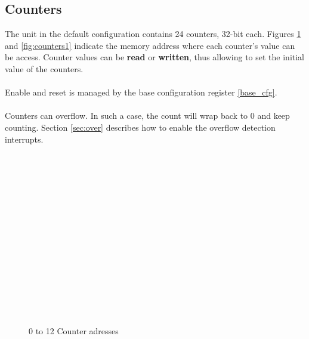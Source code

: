 \subsection{Counters}\label{sec:count}
The unit in the default configuration contains 24 counters, 32-bit each. Figures \ref{fig:counters0} and \ref{fig:counters1} indicate the memory address where each counter's value can be access. Counter values can be \textbf{read} or \textbf{written}, thus allowing to set the initial value of the counters.\\
\\
Enable and reset is managed by the base configuration register \ref{base_cfg}.\\
\\
Counters can overflow. In such a case, the count will wrap back to 0 and keep counting. Section \ref{sec:over} describes how to enable the overflow detection interrupts.\\
\\
\begin{figure}[H]
	\begin{center}
		 \\
		 \\
		 \\
		 \\
		 \\
		 \\
		 \\
		 \\
		 \\
		 \\
		 \\
		 \\
		 \\
		\end{center}
	\caption{0 to 12 Counter adresses}\label{fig:counters0}
\end{figure}

